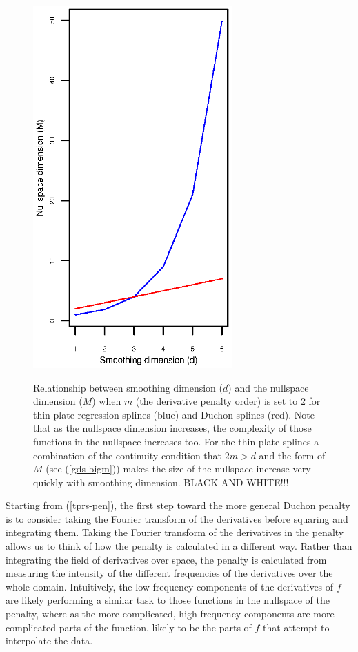 \documentclass[useAMS,referee, usegraphicx]{biom}
\begin{document}
\begin{figure}
\centering
\includegraphics[width=3in]{figs/nullspace-dim.ps} \\
\caption{Relationship between smoothing dimension ($d$) and the nullspace dimension ($M$) when $m$ (the derivative penalty order) is set to 2 for thin plate regression splines (blue) and Duchon splines (red). Note that as the nullspace dimension increases, the complexity of those functions in the nullspace increases too. For the thin plate splines a combination of the continuity condition that $2m>d$ and the form of $M$ (see (\ref{gds-bigm})) makes the size of the nullspace increase very quickly with smoothing dimension. BLACK AND WHITE!!!}
\label{nullspace-dim}
\end{figure}

Starting from (\ref{tprs-pen}), the first step toward the more general Duchon penalty is to consider taking the Fourier transform of the derivatives before squaring and integrating them. Taking the Fourier transform of the derivatives in the penalty allows us to think of how the penalty is calculated in a different way. Rather than integrating the field of derivatives over space, the penalty is calculated from measuring the intensity of the different frequencies of the derivatives over the whole domain. Intuitively, the low frequency components of the derivatives of $f$ are likely performing a similar task to those functions in the nullspace of the penalty, where as the more complicated, high frequency components are more complicated parts of the function, likely to be the parts of $f$ that attempt to interpolate the data.
\end{document}
